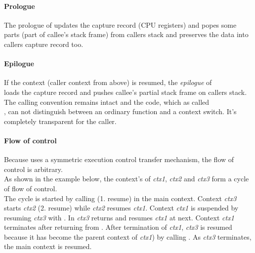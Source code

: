 \paragraph*{Prologue}
The prologue of \ectxop updates the capture record (CPU registers) and popes
some parts (part of callee's stack frame) from callers stack and preserves the
data into callers capture record too.

\paragraph*{Epilogue}
If the context (caller context from above) is resumed, the \emph{epilogue} of\\
\ectxop loads the capture record and pushes callee's partial stack frame on
callers stack. The calling convention remains intact and the code, which as
called\\
\ectxop, can not distinguish between an ordinary function and a context switch.
It's completely transparent for the caller.

\paragraph*{Flow of control}
Because \ectx uses a symmetric execution control transfer mechanism, the flow
of control is arbitrary.\\
As shown in the example below, the context's of \emph{ctx1}, \emph{ctx2} and
\emph{ctx3} form a cycle of flow of control.\\
The cycle is started by calling  (1. resume) in the main context.
Context \emph{ctx3} starts \emph{ctx2} (2. resume) while \emph{ctx2} resumes
\emph{ctx1}. Context \emph{ctx1} is suspended by resuming \emph{ctx3} with
. In \emph{ctx3}  returns and  resumes
\emph{ctx1} at next. Context \emph{ctx1} terminates after returning from
. After termination of \emph{ctx1}, \emph{ctx3} is resumed
because it has become the parent context of \emph{ctx1}) by calling .
As \emph{ctx3} terminates, the main context is resumed.

